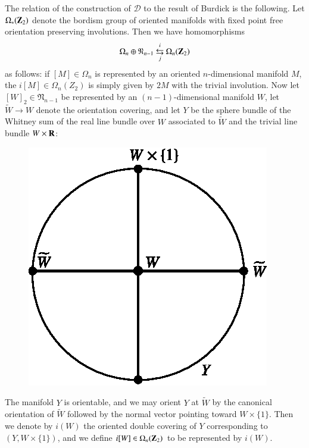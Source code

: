 The relation of the construction of $\mathscr{D}$ to the result of Burdick is the following. Let $\Omega_{*}(\mathbf{Z}_{2})$ denote the bordism group of oriented manifolds with fixed point free orientation preserving involutions. Then we have homomorphisms
$$
\Omega_{n}\oplus \mathfrak{N}_{n-1}~{\displaystyle{\mathop{\leftrightarrows}_{j}^{i}}}~ \Omega_{n}(\mathbf{Z}_{2})
$$
as follows: if $[M]\in \Omega_{n}$ is represented by an oriented $n$-dimensional manifold $M$, the $i[M]\in \Omega_{n}(Z_{2})$ is simply given by $2M$ with the trivial involution. Now let $[W]_{2}\in \mathfrak{N}_{n-1}$ be represented by an $(n-1)$-dimensional manifold $W$, let $\widetilde{W}\to W$ denote the orientation covering, and let $Y$ be the sphere bundle of the Whitney sum of the real line bundle over $W$ associated to $\widetilde{W}$ and the trivial line bundle $W\times \mathbf{R}$:
\begin{figure}[H]
\centering
\includegraphics{src/chap11/fig6.eps}
\end{figure}\pageoriginale
\noindent
The manifold $Y$ is orientable, and we may orient $Y$ at $\widetilde{W}$ by the canonical orientation of $\widetilde{W}$ followed by the normal vector pointing toward $W\times \{1\}$. Then we denote by $i(W)$ the oriented double covering of $Y$ corresponding to $(Y,W\times \{1\})$, and we define $i[W]\in \Omega_{n}(\mathbf{Z}_{2})$ to be represented by $i(W)$.

